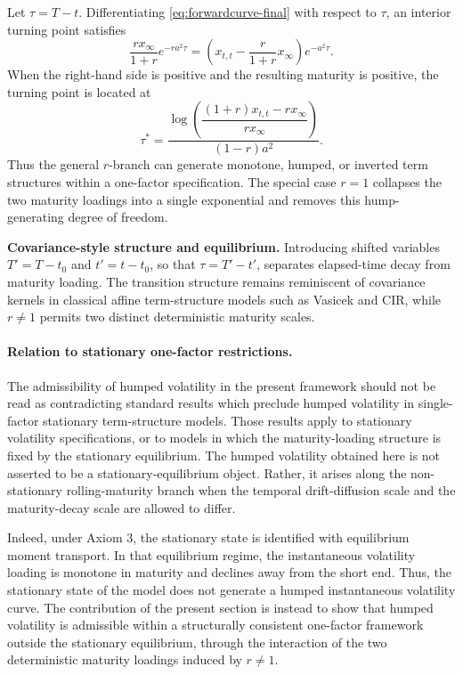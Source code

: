 \documentclass[12pt]{article}
\theoremstyle{statementstyle}
\begin{document}
Let \(\tau=T-t\). Differentiating \eqref{eq:forwardcurve-final} with
respect to \(\tau\), an interior turning point satisfies
\begin{equation}
\frac{r x_{\infty}}{1+r}e^{-ra^{2}\tau}
=
\left(
x_{t,t}-\frac{r}{1+r}x_{\infty}
\right)e^{-a^{2}\tau}.
\tag{6.3.2}\label{eq:hump-condition}
\end{equation}
When the right-hand side is positive and the resulting maturity is
positive, the turning point is located at
\begin{equation}
\tau^{\ast}
=
\frac{
\log\left(
\dfrac{(1+r)x_{t,t}-r x_{\infty}}{r x_{\infty}}
\right)
}{(1-r)a^{2}}.
\tag{6.3.3}\label{eq:hump-location}
\end{equation}
Thus the general \(r\)-branch can generate monotone, humped, or inverted
term structures within a one-factor specification. The special case
\(r=1\) collapses the two maturity loadings into a single exponential
and removes this hump-generating degree of freedom.

\medskip
\noindent\textbf{Covariance-style structure and equilibrium.}
Introducing shifted variables \(T'=T-t_{0}\) and \(t'=t-t_{0}\), so that
\(\tau=T'-t'\), separates elapsed-time decay from maturity loading. The
transition structure remains reminiscent of covariance kernels in
classical affine term-structure models such as Vasicek and CIR, while
\(r\neq 1\) permits two distinct deterministic maturity scales.

\paragraph{Relation to stationary one-factor restrictions.}
The admissibility of humped volatility in the present framework should not be read as contradicting standard results which preclude humped volatility in single-factor stationary term-structure models. Those results apply to stationary volatility specifications, or to models in which the maturity-loading structure is fixed by the stationary equilibrium. The humped volatility obtained here is not asserted to be a stationary-equilibrium object. Rather, it arises along the non-stationary rolling-maturity branch when the temporal drift-diffusion scale and the maturity-decay scale are allowed to differ.

Indeed, under Axiom 3, the stationary state is identified with equilibrium moment transport. In that equilibrium regime, the instantaneous volatility loading is monotone in maturity and declines away from the short end. Thus, the stationary state of the model does not generate a humped instantaneous volatility curve. The contribution of the present section is instead to show that humped volatility is admissible within a structurally consistent one-factor framework outside the stationary equilibrium, through the interaction of the two deterministic maturity loadings induced by \(r\neq 1\).
\end{document}
